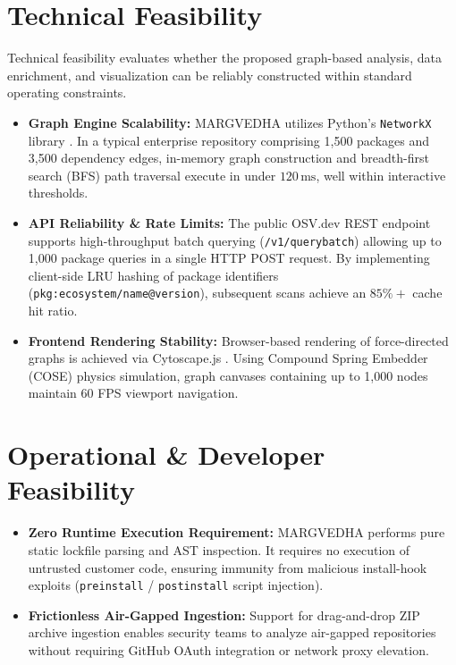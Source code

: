 \documentclass[12pt,a4paper,oneside]{report}
\begin{document}
\section{Technical Feasibility}
Technical feasibility evaluates whether the proposed graph-based analysis, data enrichment, and visualization can be reliably constructed within standard operating constraints.
\begin{itemize}
    \item \textbf{Graph Engine Scalability:} MARGVEDHA utilizes Python's \texttt{NetworkX} library \cite{hagberg2008networkx}. In a typical enterprise repository comprising 1,500 packages and 3,500 dependency edges, in-memory graph construction and breadth-first search (BFS) path traversal execute in under $120\,\text{ms}$, well within interactive thresholds.
    \item \textbf{API Reliability \& Rate Limits:} The public OSV.dev REST endpoint supports high-throughput batch querying (\texttt{/v1/querybatch}) allowing up to 1,000 package queries in a single HTTP POST request. By implementing client-side LRU hashing of package identifiers (\texttt{pkg:ecosystem/name@version}), subsequent scans achieve an $85\%+$ cache hit ratio.
    \item \textbf{Frontend Rendering Stability:} Browser-based rendering of force-directed graphs is achieved via Cytoscape.js \cite{franz2016cytoscape}. Using Compound Spring Embedder (COSE) physics simulation, graph canvases containing up to 1,000 nodes maintain 60 FPS viewport navigation.
\end{itemize}

\section{Operational \& Developer Feasibility}
\begin{itemize}
    \item \textbf{Zero Runtime Execution Requirement:} MARGVEDHA performs pure static lockfile parsing and AST inspection. It requires no execution of untrusted customer code, ensuring immunity from malicious install-hook exploits (\texttt{preinstall} / \texttt{postinstall} script injection).
    \item \textbf{Frictionless Air-Gapped Ingestion:} Support for drag-and-drop ZIP archive ingestion enables security teams to analyze air-gapped repositories without requiring GitHub OAuth integration or network proxy elevation.
\end{itemize}
\end{document}
